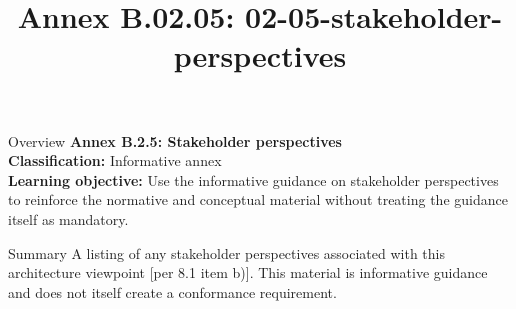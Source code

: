 \documentclass[10pt,letterpaper]{article}
\title{Annex B.02.05: 02-05-stakeholder-perspectives}
\author{}
\date{}
\begin{document}
\maketitle
\begin{CornellOverviewBox}{Overview}
{\Large\bfseries\textcolor{CNavy}{Annex B.2.5: Stakeholder perspectives}}\\[3pt]
{\small\textbf{Classification:} Informative annex}\\
{\small\textbf{Learning objective:} Use the informative guidance on stakeholder perspectives to reinforce the normative and conceptual material without treating the guidance itself as mandatory.}
\end{CornellOverviewBox}
\vspace{3pt}

\begin{CornellNotesTable}
\end{CornellNotesTable}


\begin{CornellSummaryBox}{Summary}
A listing of any stakeholder perspectives associated with this architecture viewpoint [per 8.1 item b)]. This material is informative guidance and does not itself create a conformance requirement.
\end{CornellSummaryBox}
\end{document}
